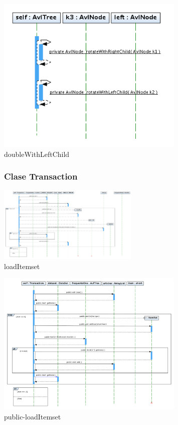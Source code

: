 \begin{figure}
\centering
\includegraphics[width=0.8\textwidth]{imgsSecuencia/AvlTree/doubleWithLeftChild.png}
\caption{doubleWithLeftChild}
\end{figure}
\newpage


\begin{figure}
\subsubsection{Clase Transaction}
\centering
\includegraphics[angle=90, width=0.6\textwidth]{imgsSecuencia/Transaction/loadItemsets2.png}
\caption{loadItemset}
\end{figure}
\newpage

\begin{figure}
\centering
\includegraphics[angle=90, width=0.8\textwidth]{imgsSecuencia/Transaction/loadItemsets.png}
\caption{public-loadItemset}
\end{figure}
\newpage

